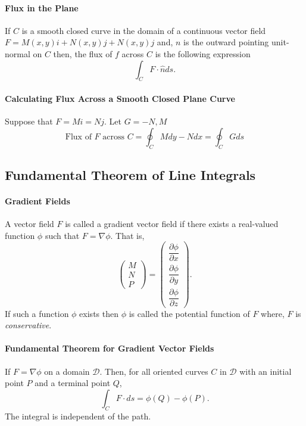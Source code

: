 \documentclass[12pt, letterpaper]{article}
\begin{document}
    \paragraph{Flux in the Plane}
    If \(C\) is a smooth closed curve in the domain of a continuous vector field
    \(F = M(x, y)i + N(x, y)j + N(x, y)j\)
    and, \(n\) is the outward pointing unit-normal on \(C\) then, the flux
    of \(f\) across \(C\) is the following expression
    \[\int_C F\cdot \hat{n} ds.\]

    \paragraph{Calculating Flux Across a Smooth Closed Plane Curve}
    Suppose that \(F = Mi = Nj\). Let \(G = -N, M\)
    \[
    \text{Flux of \(F\) across \(C\)} = 
    \oint_C M dy - N dx = \oint_C G ds
    \]
    
    \subsection{Fundamental Theorem of Line Integrals}
    
    \paragraph{Gradient Fields}
    A vector field \(F\) is called a gradient vector field if there
    exists a real-valued function \(\phi\) such that
    \(F = \nabla \phi\). 
    That is,
    \[
        \begin{pmatrix} M \\ N \\ P \end{pmatrix}
        =
        \begin{pmatrix}
            \dfrac{\partial \phi}{\partial x} \\
            \dfrac{\partial \phi}{\partial y} \\
            \dfrac{\partial \phi}{\partial z}
        \end{pmatrix}.
    \]
    If such a function \(\phi\) exists then \(\phi\) is called the potential function of \(F\)
    where, \(F\) is \textit{conservative}.

    \paragraph{Fundamental Theorem for Gradient Vector Fields}
    If \(F = \nabla \phi\) on a domain \(\mathcal{D}\). Then,
    for all oriented curves \(C\) in \(\mathcal{D}\) with an initial
    point \(P\) and a terminal point \(Q\),
    \[
        \int_C F\cdot ds = \phi(Q) - \phi(P).
    \]
    The integral is independent of the path.
    
\end{document}
